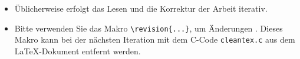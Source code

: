 \documentclass[../main.tex]{subfiles}
\begin{document}
\begin{itemize}

  \item Üblicherweise erfolgt das Lesen und die Korrektur der Arbeit iterativ.
  \item Bitte verwenden Sie das Makro \verb$\revision{...}$, um Änderungen . Dieses Makro kann bei der nächsten Iteration mit dem C-Code \verb$cleantex.c$ aus dem \LaTeX-Dokument entfernt werden.

\end{itemize}

\ifSubfilesClassLoaded{
  \printbibliography
}{}
\end{document}
